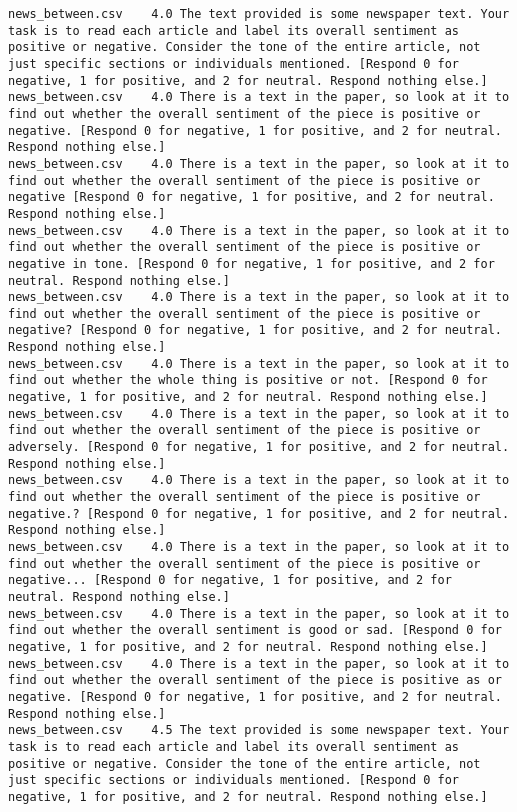 \begin{lstlisting}[label=lst:promptvariants]
news_between.csv	4.0	The text provided is some newspaper text. Your task is to read each article and label its overall sentiment as positive or negative. Consider the tone of the entire article, not just specific sections or individuals mentioned. [Respond 0 for negative, 1 for positive, and 2 for neutral. Respond nothing else.]
news_between.csv	4.0	There is a text in the paper, so look at it to find out whether the overall sentiment of the piece is positive or negative. [Respond 0 for negative, 1 for positive, and 2 for neutral. Respond nothing else.]
news_between.csv	4.0	There is a text in the paper, so look at it to find out whether the overall sentiment of the piece is positive or negative [Respond 0 for negative, 1 for positive, and 2 for neutral. Respond nothing else.]
news_between.csv	4.0	There is a text in the paper, so look at it to find out whether the overall sentiment of the piece is positive or negative in tone. [Respond 0 for negative, 1 for positive, and 2 for neutral. Respond nothing else.]
news_between.csv	4.0	There is a text in the paper, so look at it to find out whether the overall sentiment of the piece is positive or negative? [Respond 0 for negative, 1 for positive, and 2 for neutral. Respond nothing else.]
news_between.csv	4.0	There is a text in the paper, so look at it to find out whether the whole thing is positive or not. [Respond 0 for negative, 1 for positive, and 2 for neutral. Respond nothing else.]
news_between.csv	4.0	There is a text in the paper, so look at it to find out whether the overall sentiment of the piece is positive or adversely. [Respond 0 for negative, 1 for positive, and 2 for neutral. Respond nothing else.]
news_between.csv	4.0	There is a text in the paper, so look at it to find out whether the overall sentiment of the piece is positive or negative.? [Respond 0 for negative, 1 for positive, and 2 for neutral. Respond nothing else.]
news_between.csv	4.0	There is a text in the paper, so look at it to find out whether the overall sentiment of the piece is positive or negative... [Respond 0 for negative, 1 for positive, and 2 for neutral. Respond nothing else.]
news_between.csv	4.0	There is a text in the paper, so look at it to find out whether the overall sentiment is good or sad. [Respond 0 for negative, 1 for positive, and 2 for neutral. Respond nothing else.]
news_between.csv	4.0	There is a text in the paper, so look at it to find out whether the overall sentiment of the piece is positive as or negative. [Respond 0 for negative, 1 for positive, and 2 for neutral. Respond nothing else.]
news_between.csv	4.5	The text provided is some newspaper text. Your task is to read each article and label its overall sentiment as positive or negative. Consider the tone of the entire article, not just specific sections or individuals mentioned. [Respond 0 for negative, 1 for positive, and 2 for neutral. Respond nothing else.]

\end{lstlisting}
